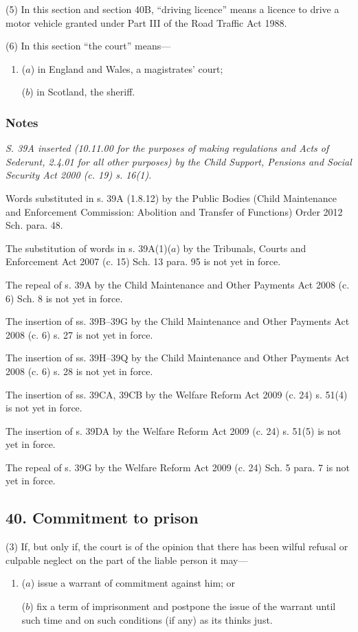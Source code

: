 \documentclass[a4paper]{article}
\newcommand\amendment[1]{\subsubsection*{Notes}{\itshape\frenchspacing\footnotesize #1 \par}}
\begin{document}
(5)
In this section and section 40B, “driving licence” means a licence to drive a motor vehicle granted under Part III of the Road Traffic Act 1988.

(6) In this section “the court” means---
\begin{enumerate}\item[]
($a$) in England and Wales, a magistrates’ court;

($b$) in Scotland, the sheriff.
\end{enumerate}

\amendment{
S. 39A inserted (10.11.00 for the purposes of making regulations and Acts of Sederunt, 2.4.01 for all other purposes) by the Child Support, Pensions and Social Security Act 2000 (c. 19) s. 16(1).

Words substituted in s. 39A (1.8.12) by the Public Bodies (Child Maintenance and Enforcement Commission: Abolition and Transfer of Functions) Order 2012 Sch. para. 48.

The substitution of words in s. 39A(1)($a$) by the Tribunals, Courts and Enforcement Act 2007 (c. 15) Sch. 13 para. 95 is not yet in force.

The repeal of s. 39A by the Child Maintenance and Other Payments Act 2008 (c. 6) Sch. 8 is not yet in force.

\medskip

The insertion of ss. 39B--39G by the Child Maintenance and Other Payments Act 2008 (c. 6) s. 27 is not yet in force.

The insertion of ss. 39H--39Q by the Child Maintenance and Other Payments Act 2008 (c. 6) s. 28 is not yet in force.

The insertion of ss. 39CA, 39CB by the Welfare Reform Act 2009 (c. 24) s. 51(4) is not yet in force.

The insertion of s. 39DA by the Welfare Reform Act 2009 (c. 24) s. 51(5) is not yet in force.

The repeal of s. 39G by the Welfare Reform Act 2009 (c. 24) Sch. 5 para. 7 is not yet in force.

}

\subsection{40. Commitment to prison}

(3)
If, but only if, the court is of the opinion that there has been wilful refusal or culpable neglect on the part of the liable person it may---
\begin{enumerate}\item[]
($a$) issue a warrant of commitment against him; or

($b$) fix a term of imprisonment and postpone the issue of the warrant until such
time and on such conditions (if any) as its thinks just.
\end{enumerate}
\end{document}
